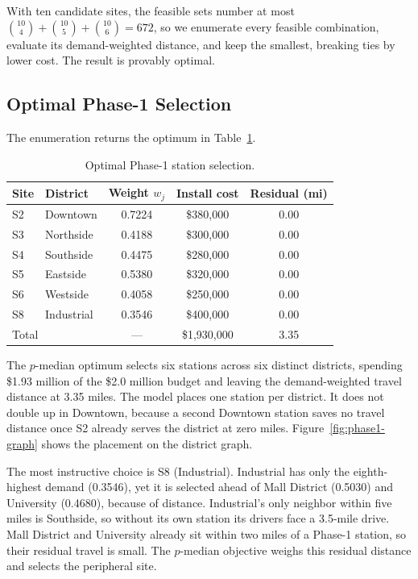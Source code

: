 \documentclass[12pt]{article}
\begin{document}
With ten candidate sites, the feasible sets number at most 
$\binom{10}{4} + \binom{10}{5} + \binom{10}{6} = 672$, so we enumerate every 
feasible combination, evaluate its demand-weighted distance, and keep the 
smallest, breaking ties by lower cost. The result is provably optimal.

\subsection{Optimal Phase-1 Selection}
\label{subsec:phase1}

The enumeration returns the optimum in Table~\ref{tab:phase1}.

\begin{table}[H]
\centering
\caption{Optimal Phase-1 station selection.}
\label{tab:phase1}
\begin{tabular}{llccc}
\toprule
Site & District & Weight $w_j$ & Install cost & Residual (mi) \\
\midrule
S2 & Downtown   & 0.7224 & \$380{,}000 & 0.00 \\
S3 & Northside  & 0.4188 & \$300{,}000 & 0.00 \\
S4 & Southside  & 0.4475 & \$280{,}000 & 0.00 \\
S5 & Eastside   & 0.5380 & \$320{,}000 & 0.00 \\
S6 & Westside   & 0.4058 & \$250{,}000 & 0.00 \\
S8 & Industrial & 0.3546 & \$400{,}000 & 0.00 \\
\midrule
\multicolumn{2}{l}{Total} & --- & \$1{,}930{,}000 & 3.35 \\
\bottomrule
\end{tabular}
\end{table}

The $p$-median optimum selects six stations across six distinct districts, spending \$1.93 million of the \$2.0 million budget and leaving the demand-weighted travel distance at 3.35 miles. The model places one station per district. It does not double up in Downtown, because a second Downtown station saves no travel distance once S2 already serves the district at zero miles. Figure~\ref{fig:phase1-graph} shows the placement on the district graph.

The most instructive choice is S8 (Industrial). Industrial has only the eighth-highest demand (0.3546), yet it is selected ahead of Mall District (0.5030) and University (0.4680), because of distance. Industrial's only neighbor within five miles is Southside, so without its own station its drivers face a 3.5-mile drive. Mall District and University already sit within two miles of a Phase-1 station, so their residual travel is small. The $p$-median objective weighs this residual distance and selects the peripheral site.
\end{document}
